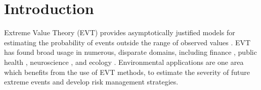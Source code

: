 \documentclass[12pt,compact]{article}
\begin{document}
\section{Introduction}
\label{sec:intro}
Extreme Value Theory (EVT) provides asymptotically justified models for estimating the probability of events outside the range of observed values \citep{Coles2001}.
EVT has found broad usage in numerous, disparate domains, including finance \citep{Poon2004}, public health \citep{Vettori2019}, neuroscience \citep{Talento2025}, and ecology \citep{Koh2025}.
Environmental applications are one area which benefits from the use of EVT methods, to estimate the severity of future extreme events and develop risk management strategies. %
\end{document}
